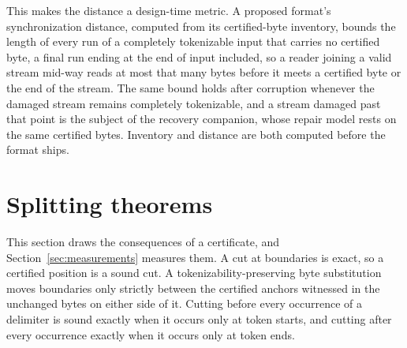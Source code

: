 \documentclass[11pt,a4paper]{article}
\theoremstyle{definition}
\theoremstyle{plain}
\begin{document}
This makes the distance a design-time metric. A proposed format's synchronization distance, computed from its
certified-byte inventory, bounds the length of every run of a completely tokenizable input that carries no certified
byte, a final run ending at the end of input included, so a reader joining a valid stream mid-way reads at most that
many bytes before it meets a certified byte or the end of the stream. The same bound holds after corruption whenever the
damaged stream remains completely tokenizable, and a stream damaged past that point is the subject of the recovery
companion, whose repair model rests on the same certified bytes. Inventory and distance are both computed before the
format ships.



\section{Splitting theorems}\label{sec:splitting}

This section draws the consequences of a certificate, and Section~\ref{sec:measurements} measures them. A cut at
boundaries is exact, so a certified position is a sound cut. A tokenizability-preserving byte substitution moves
boundaries only strictly between the certified anchors witnessed in the unchanged bytes on either side of it. Cutting
before every occurrence of a delimiter is sound exactly when it occurs only at token starts, and cutting after every
occurrence exactly when it occurs only at token ends.
\end{document}
